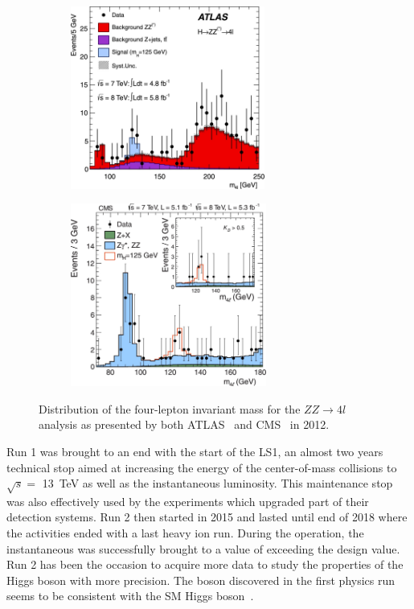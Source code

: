 	\begin{figure}[H]
		\begin{subfigure}{0.5\linewidth}
			\centering
			\includegraphics[height = 6cm]{fig/chapt2/Higgs-ATLAS-ZZ-4l.jpg}
			\caption{\label{fig:Higgs:A}}
		\end{subfigure}
		\begin{subfigure}{0.5\linewidth}
			\centering
			\includegraphics[height = 6cm]{fig/chapt2/Higgs-CMS-ZZ-4l.jpg}
			\caption{\label{fig:Higgs:B}}
		\end{subfigure}
		\caption{\label{fig:Higgs} Distribution of the four-lepton invariant mass for the $ZZ \rightarrow 4l$ analysis as presented by both ATLAS~\cite{ATLAS2012} and CMS~\cite{CMS2012} in 2012.}
	\end{figure}
	
	Run 1 was brought to an end with the start of the \acl{LS1}, an almost two years technical stop aimed at increasing the energy of the center-of-mass collisions to $\sqrt{s} =$ \SI{13}{TeV} as well as the instantaneous luminosity. This maintenance stop was also effectively used by the experiments which upgraded part of their detection systems. Run 2 then started in 2015 and lasted until end of 2018 where the activities ended with a last heavy ion run. During the operation, the instantaneous was successfully brought to a value of \siflux exceeding the design value. Run 2 has been the occasion to acquire more data to study the properties of the Higgs boson with more precision. The boson discovered in the first physics run seems to be consistent with the SM Higgs boson~\cite{HIGGS2015}.
	
